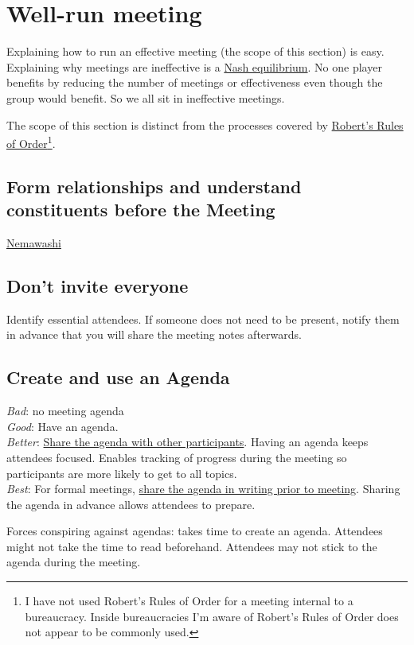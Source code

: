 \section{Well-run meeting\label{sec:well-run-meeting}}

Explaining how to run an effective meeting (the scope of this section) is easy. Explaining why meetings are ineffective is a \href{https://en.wikipedia.org/wiki/Nash_equilibrium}{Nash equilibrium}. No one player benefits by reducing the number of meetings or effectiveness even though the group would benefit. So we all sit in ineffective meetings. 

The scope of this section is distinct from the processes covered by \href{https://en.wikipedia.org/wiki/Robert\%27s_Rules_of_Order}{Robert's Rules of Order}\footnote{I have not used Robert's Rules of Order for a meeting internal to a bureaucracy. Inside bureaucracies I'm aware of Robert's Rules of Order does not appear to be commonly used.}. 

\subsection*{Form relationships and understand constituents before the Meeting}

\href{https://en.wikipedia.org/wiki/Nemawashi}{Nemawashi}

\subsection*{Don't invite everyone}
Identify essential attendees. If someone does not need to be present, notify them in advance that you will share the meeting notes afterwards. 

\subsection*{Create and use an Agenda}
\textit{Bad}: no meeting agenda\\
\textit{Good}: Have an agenda. \\
\textit{Better}: \underline{Share the agenda with other participants}. Having an agenda keeps attendees focused.  Enables tracking of progress during the meeting so participants are more likely to get to all topics.\\
\textit{Best}: For formal meetings, \underline{share the agenda in writing prior to meeting}. Sharing the agenda in advance allows attendees to prepare.

Forces conspiring against agendas: takes time to create an agenda. Attendees might not take the time to read beforehand. Attendees may not stick to the agenda during the meeting.

